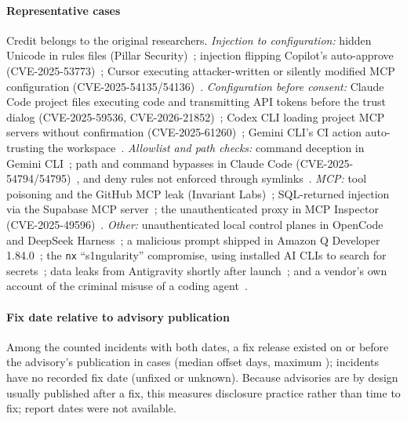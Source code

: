 \paragraph*{Representative cases} Credit belongs to the original researchers. \emph{Injection to configuration:} hidden Unicode in rules files (Pillar Security)\evTP~\cite{pillar2025rulesfile}; injection flipping Copilot's auto-approve (CVE-2025-53773)\evTP~\cite{etr2025copilot}; Cursor executing attacker-written or silently modified MCP configuration (CVE-2025-54135/54136)\evD\evTP~\cite{cursor_54135,checkpoint2025mcpoison}. \emph{Configuration before consent:} Claude Code project files executing code and transmitting API tokens before the trust dialog (CVE-2025-59536, CVE-2026-21852)\evTP~\cite{checkpoint2026claude}; Codex CLI loading project MCP servers without confirmation (CVE-2025-61260)\evTP~\cite{checkpoint2025codex}; Gemini CLI's CI action auto-trusting the workspace\evD~\cite{ghsa_gemini_action}. \emph{Allowlist and path checks:} command deception in Gemini CLI\evTP~\cite{tracebit2025gemini}; path and command bypasses in Claude Code (CVE-2025-54794/54795)\evTP~\cite{cymulate2025inverse}, and deny rules not enforced through symlinks\evD~\cite{ghsa_cc_symlink}. \emph{MCP:} tool poisoning and the GitHub MCP leak (Invariant Labs)\evTP~\cite{invariant2025toolpoisoning,invariant2025github}; SQL-returned injection via the Supabase MCP server\evTP~\cite{generalanalysis2025supabase}; the unauthenticated proxy in MCP Inspector (CVE-2025-49596)\evD\evTP~\cite{mcp_inspector_49596,oligo2025inspector}. \emph{Other:} unauthenticated local control planes in OpenCode and DeepSeek Harness\evD~\cite{ghsa_opencode_server,ghsa_dsh_host}; a malicious prompt shipped in Amazon Q Developer 1.84.0\evD~\cite{amazonq2025}; the \texttt{nx} ``s1ngularity'' compromise, using installed AI CLIs to search for secrets\evD~\cite{nx2025s1ngularity}; data leaks from Antigravity shortly after launch\evTP~\cite{promptarmor2025antigravity,etr2025antigravity}; and a vendor's own account of the criminal misuse of a coding agent~\cite{anthropic2025aug}.

\paragraph*{Fix date relative to advisory publication} Among the \nLatency{} counted incidents with both dates, a fix release existed on or before the advisory's publication in \nLatencyBefore{} cases (median offset \nLatencyMedian{} days, maximum \nLatencyMax{}); \nIncNoFixDate{} incidents have no recorded fix date (unfixed or unknown). Because advisories are by design usually published after a fix, this measures disclosure practice rather than time to fix; report dates were not available.
